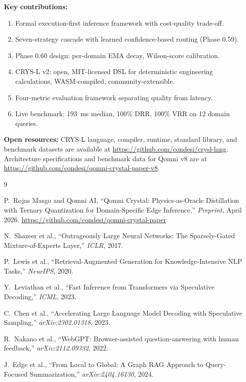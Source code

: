 \documentclass[12pt,a4paper]{article}
\begin{document}
\textbf{Key contributions:}
\begin{enumerate}
  \item Formal execution-first inference framework with cost-quality trade-off.
  \item Seven-strategy cascade with learned confidence-based routing (Phase 0.59).
  \item Phase 0.60 design: per-domain EMA decay, Wilson-score calibration.
  \item CRYS-L v2: open, MIT-licensed DSL for deterministic engineering
    calculations, WASM-compiled, community-extensible.
  \item Four-metric evaluation framework separating quality from latency.
  \item Live benchmark: 193~ms median, 100\% DRR, 100\% VRR on 12 domain queries.
\end{enumerate}

\textbf{Open resources:}
CRYS-L language, compiler, runtime, standard library, and benchmark datasets
are available at \url{https://github.com/condesi/crysl-lang}.
Architecture specifications and benchmark data for Qomni v8 are at
\url{https://github.com/condesi/qomni-crystal-paper-v8}.


\begin{thebibliography}{9}

  P.~Rojas Masgo and Qomni AI,
  ``Qomni Crystal: Physics-as-Oracle Distillation with Ternary Quantization
  for Domain-Specific Edge Inference,''
  \emph{Preprint}, April 2026.
  \url{https://github.com/condesi/qomni-crystal-paper}

  N.~Shazeer et al.,
  ``Outrageously Large Neural Networks: The Sparsely-Gated Mixture-of-Experts Layer,''
  \emph{ICLR}, 2017.

  P.~Lewis et al.,
  ``Retrieval-Augmented Generation for Knowledge-Intensive NLP Tasks,''
  \emph{NeurIPS}, 2020.

  Y.~Leviathan et al.,
  ``Fast Inference from Transformers via Speculative Decoding,''
  \emph{ICML}, 2023.

  C.~Chen et al.,
  ``Accelerating Large Language Model Decoding with Speculative Sampling,''
  \emph{arXiv:2302.01318}, 2023.

  R.~Nakano et al.,
  ``WebGPT: Browser-assisted question-answering with human feedback,''
  \emph{arXiv:2112.09332}, 2022.

  J.~Edge et al.,
  ``From Local to Global: A Graph RAG Approach to Query-Focused Summarization,''
  \emph{arXiv:2404.16130}, 2024.

\end{thebibliography}
\end{document}

